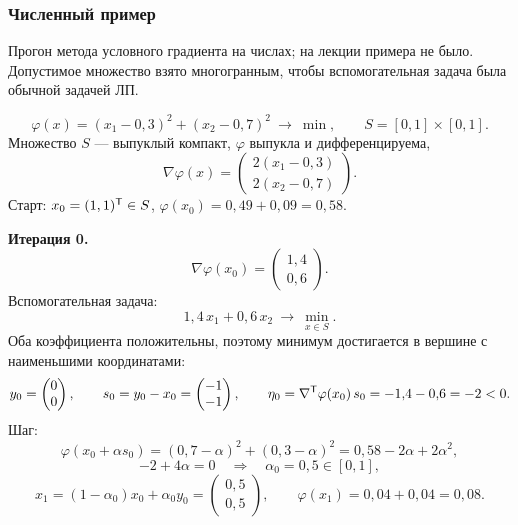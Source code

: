 \subsubsection*{Численный пример}

\begin{idea}[title={Откуда этот материал}]
Прогон метода условного градиента на числах; на лекции примера не было.
Допустимое множество взято многогранным, чтобы вспомогательная задача была
обычной задачей ЛП.
\end{idea}

\begin{example}\label{ex:frank-wolfe-run}
\[
  \varphi(x) = (x_1 - 0{,}3)^2 + (x_2 - 0{,}7)^2 \ \longrightarrow\ \min ,
  \qquad
  S = [0,1] \times [0,1] .
\]
Множество $S$ — выпуклый компакт, $\varphi$ выпукла и дифференцируема,
\[
  \nabla\varphi(x) = \begin{pmatrix} 2(x_1 - 0{,}3) \\ 2(x_2 - 0{,}7) \end{pmatrix} .
\]
Старт: $x_0 = (1,1)^{\mathsf{T}} \in S$, $\varphi(x_0) = 0{,}49 + 0{,}09 = 0{,}58$.

\medskip
\noindent\textbf{Итерация 0.}
\[
  \nabla\varphi(x_0) = \begin{pmatrix} 1{,}4 \\ 0{,}6 \end{pmatrix} .
\]
Вспомогательная задача:
\[
  1{,}4\,x_1 + 0{,}6\,x_2 \ \longrightarrow\ \min_{x \in S} .
\]
Оба коэффициента положительны, поэтому минимум достигается в вершине с
наименьшими координатами:
\[
  y_0 = \begin{pmatrix} 0 \\ 0 \end{pmatrix} ,
  \qquad
  s_0 = y_0 - x_0 = \begin{pmatrix} -1 \\ -1 \end{pmatrix} ,
  \qquad
  \eta_0 = \nabla^{\mathsf{T}}\varphi(x_0)\,s_0 = -1{,}4 - 0{,}6 = -2 < 0 .
\]
Шаг:
\[
  \varphi(x_0 + \alpha s_0)
   = (0{,}7 - \alpha)^2 + (0{,}3 - \alpha)^2
   = 0{,}58 - 2\alpha + 2\alpha^2 ,
\]
\[
  -2 + 4\alpha = 0 \quad\Longrightarrow\quad \alpha_0 = 0{,}5 \in [0,1] ,
\]
\[
  x_1 = (1-\alpha_0)x_0 + \alpha_0 y_0
      = \begin{pmatrix} 0{,}5 \\ 0{,}5 \end{pmatrix} ,
  \qquad
  \varphi(x_1) = 0{,}04 + 0{,}04 = 0{,}08 .
\]


\end{example}
